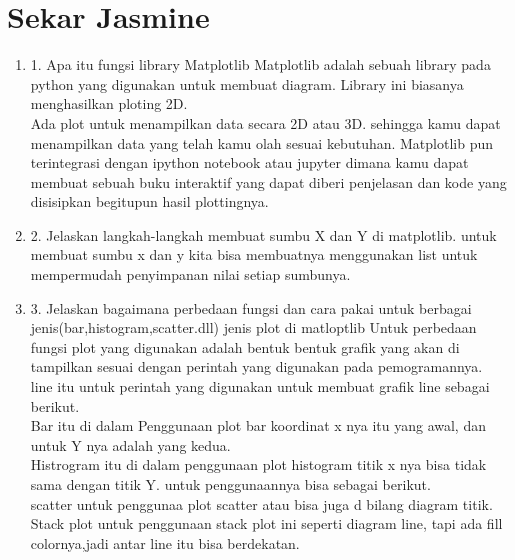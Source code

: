 \documentclass[10pt]{article}
\begin{document}
\section{Sekar Jasmine}
\begin{enumerate}


\item 1. Apa itu fungsi library Matplotlib
Matplotlib adalah sebuah library pada python yang digunakan untuk membuat diagram. Library ini biasanya menghasilkan ploting 2D.\\

Ada plot untuk menampilkan data secara 2D atau 3D. sehingga kamu dapat menampilkan data yang telah kamu olah sesuai kebutuhan. Matplotlib pun terintegrasi dengan ipython notebook atau jupyter dimana kamu dapat membuat sebuah buku interaktif yang dapat diberi penjelasan dan kode yang disisipkan begitupun hasil plottingnya.\\

\item 2. Jelaskan langkah-langkah membuat sumbu X dan Y di matplotlib.
untuk membuat sumbu x dan y kita bisa membuatnya menggunakan list untuk mempermudah penyimpanan nilai setiap sumbunya.\\


\item 3. Jelaskan bagaimana perbedaan fungsi dan cara pakai untuk berbagai jenis(bar,histogram,scatter.dll) jenis plot di matloptlib
Untuk perbedaan fungsi plot yang digunakan adalah bentuk bentuk grafik yang akan di tampilkan sesuai dengan perintah yang digunakan pada pemogramannya.\\

line itu untuk perintah yang digunakan untuk membuat grafik line sebagai berikut.\\

Bar itu di dalam Penggunaan plot bar koordinat x nya itu yang awal, dan untuk Y nya adalah yang kedua.\\

Histrogram itu di dalam penggunaan plot histogram titik x nya bisa tidak sama dengan titik Y. untuk penggunaannya bisa sebagai berikut.\\

scatter untuk penggunaa plot scatter atau bisa juga d bilang diagram titik.\\

Stack plot untuk penggunaan stack plot ini seperti diagram line, tapi ada fill colornya,jadi antar line itu bisa berdekatan.\\



\end{enumerate}
\end{document}
